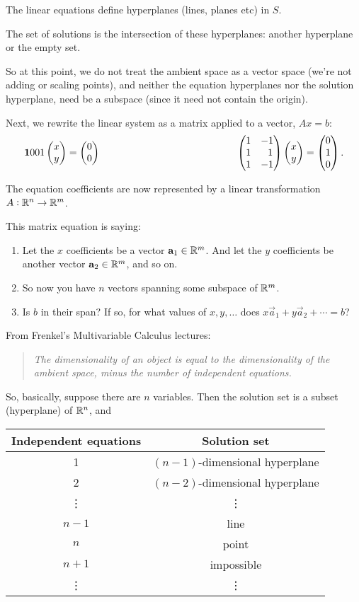 The linear equations define hyperplanes (lines, planes etc) in $S$.

The set of solutions is the intersection of these hyperplanes: another
hyperplane or the empty set.

So at this point, we do not treat the ambient space as a vector space (we're
not adding or scaling points), and neither the equation hyperplanes nor the
solution hyperplane, need be a subspace (since it need not contain the origin).

Next, we rewrite the linear system as a matrix applied to a vector, $Ax = b$:
\begin{align*}
  \begin{array}{cc}
    \mathbf{1}{0}
        {0}{1} \begin{pmatrix}x\\y\end{pmatrix} = \begin{pmatrix}0\\0\end{pmatrix}
    ~~~~~~~~~~~~~~~~~~~~~~~~~~~~~~~~~~~~~~~&
    \begin{pmatrix}1 & -1\\1 & ~~1\\1 & -1\\ \end{pmatrix} \begin{pmatrix}x\\y\end{pmatrix} = \begin{pmatrix}0\\1\\0\end{pmatrix}.
  \end{array}
\end{align*}

The equation coefficients are now represented by a linear transformation
$A:\mathbb{R}^n \to \mathbb{R}^m$.

This matrix equation is saying:
\begin{enumerate}
\item Let the $x$ coefficients be a vector $\mathbf a_1 \in \mathbb{R}^m$. And let the $y$
  coefficients be another vector $\mathbf a_2 \in \mathbb{R}^m$, and so on.
\item So now you have $n$ vectors spanning some subspace of $\mathbb{R}^m$.
\item Is $b$ in their span? If so, for what values of $x, y, \ldots$ does
  $x\vec a_1 + y\vec a_2 + \cdots = b$?
\end{enumerate}

From Frenkel's Multivariable Calculus lectures:

\begin{center}
  \begin{quote}
    \textit{The dimensionality of an object is equal to the dimensionality of the
      ambient space, minus the number of independent equations.}
  \end{quote}
\end{center}

So, basically, suppose there are $n$ variables. Then the solution set is a
subset (hyperplane) of $\mathbb{R}^n$, and

\begin{tabular}{c|c}
  Independent equations & Solution set\\
  \hline
  1                     & $(n - 1)$-dimensional hyperplane \\
  2                     & $(n - 2)$-dimensional hyperplane \\
  \vdots                & \vdots \\
  $n-1$                 & line \\
  $n$                   & point \\
  $n + 1$               & impossible \\
  \vdots                & \vdots
\end{tabular}

